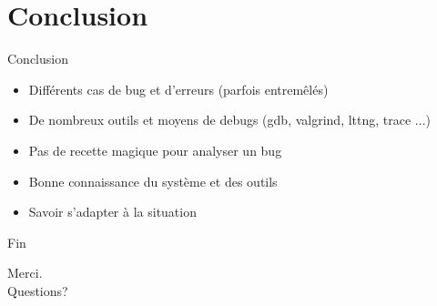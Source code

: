 \section{Conclusion}

\begin{frame}{Conclusion}
	\begin{itemize}
		\item
			Différents cas de bug et d'erreurs (parfois entremêlés)
		\item
			De nombreux outils et moyens de debugs (gdb, valgrind, lttng, trace ...)
		\item
			Pas de recette magique pour analyser un bug
		\item
			Bonne connaissance du système et des outils
		\item
			Savoir s'adapter à la situation
	\end{itemize}
\end{frame}

\begin{frame}{Fin}
\begin{center}
\huge{Merci.\\Questions?}
\end{center}
\end{frame}

